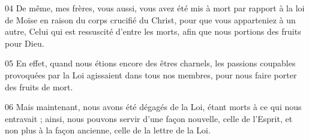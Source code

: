 
04 De même, mes frères, vous aussi, vous avez été mis à mort par rapport à la loi de Moïse en raison du corps crucifié du Christ, pour que vous apparteniez à un autre, Celui qui est ressuscité d’entre les morts, afin que nous portions des fruits pour Dieu.

05 En effet, quand nous étions encore des êtres charnels, les passions coupables provoquées par la Loi agissaient dans tous nos membres, pour nous faire porter des fruits de mort.

06 Mais maintenant, nous avons été dégagés de la Loi, étant morts à ce qui nous entravait ; ainsi, nous pouvons servir d’une façon nouvelle, celle de l’Esprit, et non plus à la façon ancienne, celle de la lettre de la Loi.
